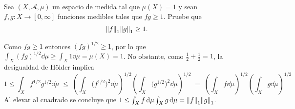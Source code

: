 \setcounter{neje}{47}
\begin{nejer}
Sea $(X, \mathcal{A}, \mu)$ un espacio de medida tal que $\mu(X) = 1$ y sean $f, g \colon X \to [0, \infty]$ funciones medibles tales que $fg \ge 1$. Pruebe que
$$
\norm{f}_1\norm{g}_1 \ge 1.
$$
\end{nejer}
\begin{sol}
Como $fg \ge 1$ entonces $(fg)^{1/2} \ge 1$, por lo que $\int_X (fg)^{1/2} \dd{\mu} \ge \int_X 1 \dd{\mu} = \mu(X) = 1$. No obstante, como $\frac{1}{2} + \frac{1}{2} = 1$, la desigualdad de Hölder implica
\[
1
\le \int_X f^{1/2}g^{1/2} \dd{\mu} 
\;\le\; \left(\int_X\big(f^{1/2}\big)^2 \dd{\mu}\right)^{1/2} \left(\int_X\big(g^{1/2}\big)^2 \dd{\mu}\right)^{1/2}
\;=\; \left(\int_X f \dd{\mu}\right)^{1/2} \left(\int_X g \dd{\mu}\right)^{1/2}
\]
Al elevar al cuadrado se concluye que $1 \leq \int_Xf\dd{\mu}\int_X g \dd{\mu} = \norm{f}_1\norm{g}_1$.
\end{sol}